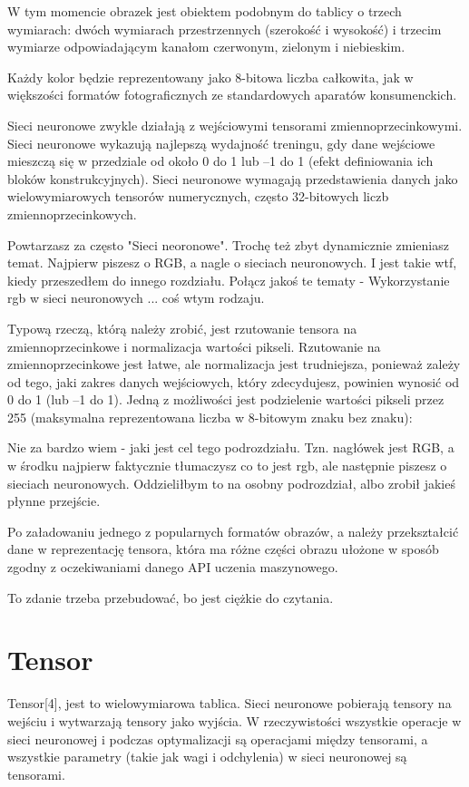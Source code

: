 \documentclass[brudnopis]{xmgr}
\begin{document}
W tym momencie obrazek jest obiektem podobnym do tablicy o trzech wymiarach: dwóch wymiarach przestrzennych (szerokość i wysokość) i trzecim wymiarze odpowiadającym kanałom czerwonym, zielonym i niebieskim. 

Każdy kolor będzie reprezentowany jako 8-bitowa liczba całkowita, jak w większości formatów fotograficznych ze standardowych aparatów konsumenckich.

Sieci neuronowe zwykle działają z wejściowymi tensorami zmiennoprzecinkowymi. Sieci neuronowe wykazują najlepszą wydajność treningu, gdy dane wejściowe mieszczą się w przedziale od około 0 do 1 lub –1 do 1 (efekt definiowania ich bloków konstrukcyjnych). Sieci neuronowe wymagają przedstawienia danych jako wielowymiarowych tensorów numerycznych, często 32-bitowych liczb zmiennoprzecinkowych.

Powtarzasz za często "Sieci neoronowe". Trochę też zbyt dynamicznie zmieniasz temat. Najpierw piszesz o RGB, a nagle o sieciach neuronowych. I jest takie wtf, kiedy przeszedłem do innego rozdziału. Połącz jakoś te tematy - Wykorzystanie rgb w sieci neuronowych ... coś wtym rodzaju.


Typową rzeczą, którą należy zrobić, jest rzutowanie tensora na zmiennoprzecinkowe i normalizacja wartości pikseli. Rzutowanie na zmiennoprzecinkowe jest łatwe, ale normalizacja jest trudniejsza, ponieważ zależy od tego, jaki zakres danych wejściowych, który zdecydujesz, powinien wynosić od 0 do 1 (lub –1 do 1). Jedną z możliwości jest podzielenie wartości pikseli przez 255 (maksymalna reprezentowana liczba w 8-bitowym znaku bez znaku):


Nie za bardzo wiem - jaki jest cel tego podrozdziału. Tzn. nagłówek jest RGB, a w środku najpierw faktycznie tłumaczysz co to jest rgb, ale następnie piszesz o sieciach neuronowych. Oddzieliłbym to na osobny podrozdział, albo zrobił jakieś płynne przejście. 

Po załadowaniu jednego z popularnych formatów obrazów, a należy przekształcić dane w reprezentację tensora, która ma różne części obrazu ułożone w sposób zgodny z oczekiwaniami danego API uczenia maszynowego.

To zdanie trzeba przebudować, bo jest ciężkie do czytania.

\section{Tensor\label{s:dsssl}}
Tensor[4], jest to wielowymiarowa tablica. Sieci neuronowe pobierają tensory na wejściu i wytwarzają tensory jako wyjścia. W rzeczywistości wszystkie operacje w sieci neuronowej i podczas optymalizacji są operacjami między tensorami, a wszystkie parametry (takie jak wagi i odchylenia) w sieci neuronowej są tensorami.
\end{document}
